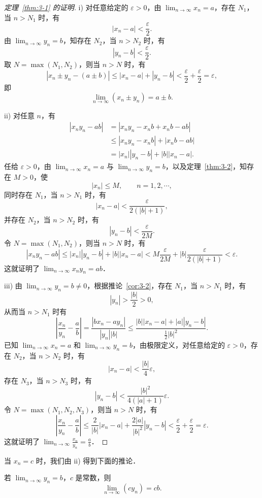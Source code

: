 \begin{proof}[定理~\ref{thm:3-1} 的证明]
i) 对任意给定的 $\varepsilon>0$，由 $\lim_{n\to\infty} x_n = a$，存在 $N_1$，当 $n>N_1$ 时，有
\[
|x_n - a| < \frac{\varepsilon}{2}.
\]
由 $\lim_{n\to\infty}y_n = b$，知存在 $N_2$，当 $n>N_2$ 时，有
\[
|y_n - b| < \frac{\varepsilon}{2}.
\]
取 $N = \max(N_1, N_2)$，则当 $n > N$ 时，有
\[
|x_n \pm y_n - (a \pm b)| \leqslant |x_n - a| + |y_n - b| < \frac{\varepsilon}{2} + \frac{\varepsilon}{2} = \varepsilon,
\]
即
\[
\lim_{n\to\infty}(x_n \pm y_n) = a \pm b.
\]

ii) 对任意 $n$，有
\[
\begin{aligned}
|x_n y_n - ab| &= |x_n y_n - x_n b + x_n b - ab| \\
&\leqslant |x_n y_n - x_n b| + |x_n b - ab| \\
&= |x_n||y_n - b| + |b||x_n - a|.
\end{aligned}
\]
任给 $\varepsilon>0$，由 $\lim_{n\to\infty}x_n = a$ 与 $\lim_{n\to\infty}y_n = b$，以及定理~\ref{thm:3-2}，知存在 $M>0$，使
\[
|x_n| \leqslant M,\qquad n=1,2,\cdots,
\]
同时存在 $N_1$，当 $n > N_1$ 时，有
\[
|x_n - a| < \frac{\varepsilon}{2(|b|+1)},
\]
并存在 $N_2$，当 $n > N_2$ 时，有
\[
|y_n - b| < \frac{\varepsilon}{2M}.
\]
令 $N = \max(N_1, N_2)$，则当 $n > N$ 时，有
\[
|x_n y_n - ab| \leqslant |x_n||y_n - b| + |b||x_n - a| < M\frac{\varepsilon}{2M} + |b|\frac{\varepsilon}{2(|b|+1)} < \varepsilon.
\]
这就证明了 $\lim_{n\to\infty}x_n y_n = ab$．

iii) 由 $\lim_{n\to\infty}y_n = b \neq 0$，根据推论~\ref{cor:3-2}，存在 $N_1$，当 $n>N_1$ 时，有
\[
|y_n| > \frac{|b|}{2} > 0,
\]
从而当 $n>N_1$ 时有
\[
\left|\frac{x_n}{y_n} - \frac{a}{b}\right| = \frac{|b x_n - a y_n|}{|y_n||b|} \leqslant \frac{|b||x_n - a| + |a||y_n - b|}{\frac{1}{2}|b|^2}.
\]
已知 $\lim_{n\to\infty}x_n = a$ 和 $\lim_{n\to\infty}y_n = b$，由极限定义，对任意给定的 $\varepsilon>0$，存在 $N_2$，当 $n>N_2$ 时，有
\[
|x_n - a| < \frac{|b|}{4}\varepsilon,
\]
存在 $N_3$，当 $n > N_3$ 时，有
\[
|y_n - b| < \frac{|b|^2}{4(|a|+1)}\varepsilon.
\]
令 $N = \max(N_1, N_2, N_3)$，则当 $n > N$ 时，有
\[
\left|\frac{x_n}{y_n} - \frac{a}{b}\right| \leqslant \frac{2}{|b|}|x_n - a| + \frac{2|a|}{|b|^2}|y_n - b| < \frac{\varepsilon}{2} + \frac{\varepsilon}{2} = \varepsilon.
\]
这就证明了 $\lim_{n\to\infty}\frac{x_n}{y_n} = \frac{a}{b}$．
\end{proof}

当 $x_n = c$ 时，我们由 ii) 得到下面的推论．

\begin{corollary}\label{cor:3-3}
若 $\lim_{n\to\infty}y_n = b$，$c$ 是常数，则
\[
\lim_{n\to\infty}(c y_n) = cb.
\]
\end{corollary}

